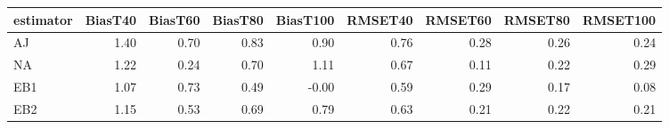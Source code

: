 \begin{table}[ht]
\centering
\begin{tabular}{lrrrrrrrr}
  \toprule
estimator & BiasT40 & BiasT60 & BiasT80 & BiasT100 & RMSET40 & RMSET60 & RMSET80 & RMSET100 \\ 
  \midrule
AJ & 1.40 & 0.70 & 0.83 & 0.90 & 0.76 & 0.28 & 0.26 & 0.24 \\ 
  NA & 1.22 & 0.24 & 0.70 & 1.11 & 0.67 & 0.11 & 0.22 & 0.29 \\ 
  EB1 & 1.07 & 0.73 & 0.49 & -0.00 & 0.59 & 0.29 & 0.17 & 0.08 \\ 
  EB2 & 1.15 & 0.53 & 0.69 & 0.79 & 0.63 & 0.21 & 0.22 & 0.21 \\ 
   \bottomrule
\end{tabular}
\end{table}
